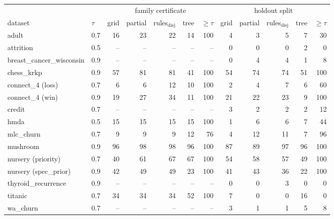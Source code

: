 \begin{tabular}{llrrrrrrrrrr}
\toprule
& & \multicolumn{5}{c}{family certificate} & \multicolumn{5}{c}{holdout split}\\
dataset & $\tau$ & grid & partial & rules$_{\mathrm{disj}}$ & tree & $\ge\tau$ & grid & partial & rules$_{\mathrm{disj}}$ & tree & $\ge\tau$\\
\midrule
adult & 0.7 & 16 & 23 & 22 & 14 & 100 & 4 & 3 & 5 & 7 & 30\\
attrition & 0.5 & -- & -- & -- & -- & -- & 0 & 0 & 0 & 2 & 0\\
breast\_cancer\_wisconsin & 0.9 & -- & -- & -- & -- & -- & 0 & 4 & 4 & 1 & 8\\
chess\_krkp & 0.9 & 57 & 81 & 81 & 41 & 100 & 54 & 74 & 74 & 51 & 100\\
connect\_4 (loss) & 0.7 & 6 & 6 & 12 & 10 & 100 & 2 & 4 & 7 & 6 & 60\\
connect\_4 (win) & 0.9 & 19 & 27 & 34 & 11 & 100 & 21 & 22 & 23 & 9 & 100\\
credit & 0.7 & -- & -- & -- & -- & -- & 3 & 2 & 2 & 2 & 12\\
hmda & 0.5 & 15 & 15 & 15 & 15 & 100 & 1 & 6 & 6 & 7 & 44\\
mlc\_churn & 0.7 & 9 & 9 & 9 & 12 & 76 & 4 & 12 & 11 & 7 & 96\\
mushroom & 0.9 & 96 & 98 & 98 & 96 & 100 & 87 & 89 & 97 & 96 & 100\\
nursery (priority) & 0.7 & 40 & 61 & 67 & 67 & 100 & 54 & 58 & 57 & 49 & 100\\
nursery (spec\_prior) & 0.9 & 42 & 49 & 49 & 23 & 100 & 41 & 43 & 36 & 22 & 100\\
thyroid\_recurrence & 0.9 & -- & -- & -- & -- & -- & 0 & 0 & 3 & 0 & 0\\
titanic & 0.7 & 34 & 34 & 34 & 52 & 100 & 7 & 0 & 0 & 16 & 0\\
wa\_churn & 0.7 & -- & -- & -- & -- & -- & 3 & 1 & 1 & 5 & 8\\
\bottomrule
\end{tabular}
